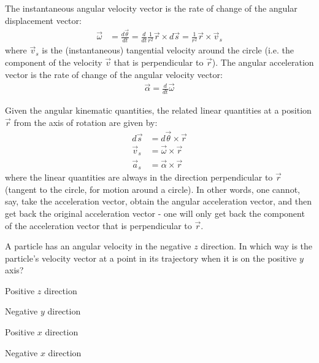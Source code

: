 The instantaneous angular velocity vector is the rate of change of the angular displacement vector:
\begin{align*}
\vec\omega &= \frac{d\vec \theta}{dt} = \frac{d}{dt} \frac{1}{r^2} \vec r \times d\vec s = \frac{1}{r^2} \vec r \times \vec v_s
\end{align*}
where $\vec v_s$ is the (instantaneous) tangential velocity around the circle (i.e. the component of the velocity $\vec v$ that is perpendicular to $\vec r$). The angular acceleration vector is the rate of change of the angular velocity vector:
\begin{align*}
\vec\alpha = \frac{d}{dt} \vec \omega
\end{align*}

Given the angular kinematic quantities, the related linear quantities at a position $\vec r$ from the axis of rotation are given by:
\begin{align}
d\vec s &= d\vec\theta \times \vec r\nonumber\\
\vec v_s &= \vec \omega \times \vec r\nonumber\\
\vec a_s&= \vec \alpha \times \vec r
\end{align}
where the linear quantities are always in the direction perpendicular to $\vec r$ (tangent to the circle, for motion around a circle). In other words, one cannot, say, take the acceleration vector, obtain the angular acceleration vector, and then get back the original acceleration vector - one will only get back the component of the acceleration vector that is perpendicular to $\vec r$.  

\begin{checkpoint}
\begin{MCquestion}{A particle has an angular velocity in the negative $z$ direction. In which way is the particle's velocity vector at a point in its trajectory when it is on the positive $y$ axis?}
\item Positive $z$ direction 
\item Negative $y$ direction
\item Positive $x$ direction \correct
\item Negative $x$ direction
\end{MCquestion}
\end{checkpoint}

